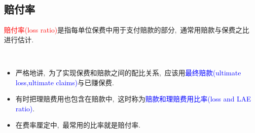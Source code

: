 \documentclass[professionalfont]{beamer}
\newcommand{\red}[1]{\textcolor{red}{#1}}
\newcommand{\blue}[1]{\textcolor{blue}{#1}}
\begin{document}
\subsection{赔付率}
\begin{frame}
	\red{赔付率(loss ratio)}是指每单位保费中用于支付赔款的部分,~通常用赔款与保费之比进行估计.
	
	~
	
	\begin{itemize}
		\item 严格地讲,~为了实现保费和赔款之间的配比关系,~应该用\blue{最终赔款(ultimate loss,ultimate claims)}与已赚保费.
		\item 有时把理赔费用也包含在赔款中,~这时称为\blue{赔款和理赔费用比率(loss and LAE ratio)}.
		\item 在费率厘定中,~最常用的比率就是赔付率.
	\end{itemize}
\end{frame}
\end{document}
